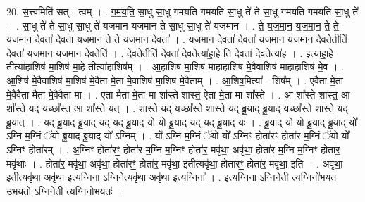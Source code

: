 \documentclass[17pt]{extarticle}
\begin{document}
20. स॒त्त्वमिति॑ सत् - त्वम् । . ग॒म॒य॒ति॒ सा॒धु सा॒धु ग॑मयति गमयति सा॒धु ते॑ ते सा॒धु ग॑मयति गमयति सा॒धु ते᳚ । . सा॒धु ते॑ ते सा॒धु सा॒धु ते॑ यजमान यजमान ते सा॒धु सा॒धु ते॑ यजमान । . ते॒ य॒ज॒मा॒न॒ य॒ज॒मा॒न॒ ते॒ ते॒ य॒ज॒मा॒न॒ दे॒वता॑ दे॒वता॑ यजमान ते ते यजमान दे॒वता᳚ । . य॒ज॒मा॒न॒ दे॒वता॑ दे॒वता॑ यजमान यजमान दे॒वतेतीति॑ दे॒वता॑ यजमान यजमान दे॒वतेति॑ । . दे॒वतेतीति॑ दे॒वता॑ दे॒वतेत्या॑हा॒हे ति॑ दे॒वता॑ दे॒वतेत्या॑ह । . इत्या॑हा॒हे तीत्या॑हा॒शिष॑ मा॒शिष॑ मा॒हे तीत्या॑हा॒शिष᳚म् । . आ॒हा॒शिष॑ मा॒शिष॑ माहाहा॒शिष॑ मे॒वैवाशिष॑ माहाहा॒शिष॑ मे॒व । . आ॒शिष॑ मे॒वैवाशिष॑ मा॒शिष॑ मे॒वैता मे॒ता मे॒वाशिष॑ मा॒शिष॑ मे॒वैताम् । . आ॒शिष॒मित्या᳚ - शिष᳚म् । . ए॒वैता मे॒ता मे॒वैवैता मैता मे॒वैवैता मा । . ए॒ता मैता मे॒ता मा शा᳚स्ते शास्त॒ ऐता मे॒ता मा शा᳚स्ते । . आ शा᳚स्ते शास्त॒ आ शा᳚स्ते॒ यद् यच्छा᳚स्त॒ आ शा᳚स्ते॒ यत् । . शा॒स्ते॒ यद् यच्छा᳚स्ते शास्ते॒ यद् ब्रू॒याद् ब्रू॒याद् यच्छा᳚स्ते शास्ते॒ यद् ब्रू॒यात् । . यद् ब्रू॒याद् ब्रू॒याद् यद् यद् ब्रू॒याद् यो यो ब्रू॒याद् यद् यद् ब्रू॒याद् यः । . ब्रू॒याद् यो यो ब्रू॒याद् ब्रू॒याद् यो᳚ ऽग्नि म॒ग्निं ॅयो ब्रू॒याद् ब्रू॒याद् यो᳚ ऽग्निम् । . यो᳚ ऽग्नि म॒ग्निं ॅयो यो᳚ ऽग्निꣳ होता॑रꣳ॒॒ होता॑र म॒ग्निं ॅयो यो᳚ ऽग्निꣳ होता॑रम् । . अ॒ग्निꣳ होता॑रꣳ॒॒ होता॑र म॒ग्नि म॒ग्निꣳ होता॑र॒ मवृ॑था॒ अवृ॑था॒ होता॑र म॒ग्नि म॒ग्निꣳ होता॑र॒ मवृ॑थाः । . होता॑र॒ मवृ॑था॒ अवृ॑था॒ होता॑रꣳ॒॒ होता॑र॒ मवृ॑था॒ इतीत्यवृ॑था॒ होता॑रꣳ॒॒ होता॑र॒ मवृ॑था॒ इति॑ । . अवृ॑था॒ इतीत्यवृ॑था॒ अवृ॑था॒ इत्य॒ग्निना॒ ऽग्निनेत्यवृ॑था॒ अवृ॑था॒ इत्य॒ग्निना᳚ । . इत्य॒ग्निना॒ ऽग्निनेती त्य॒ग्निनो॑भ॒यत॑ उभ॒यतो॒ ऽग्निनेती त्य॒ग्निनो॑भ॒यतः॑ । \newline
\end{document}
